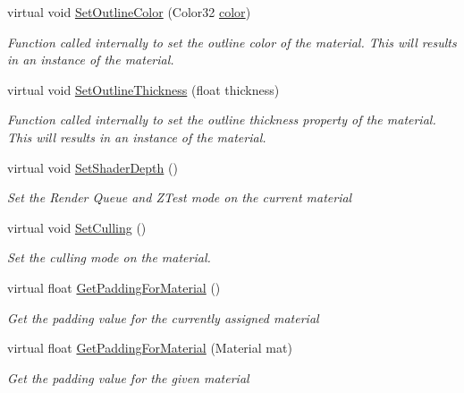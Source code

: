 \begin{DoxyCompactItemize}
virtual void \mbox{\hyperlink{class_t_m_pro_1_1_t_m_p___text_a726c0894801737f281ecf5656e9ee4d0}{Set\+Outline\+Color}} (Color32 \mbox{\hyperlink{class_t_m_pro_1_1_t_m_p___text_af874b3b1f2d1565c68e0c3ad9f79e5c4}{color}})
\begin{DoxyCompactList}\small\item\em Function called internally to set the outline color of the material. This will results in an instance of the material. \end{DoxyCompactList}\item 
virtual void \mbox{\hyperlink{class_t_m_pro_1_1_t_m_p___text_a64858ad286418942ec69bc438eec39d4}{Set\+Outline\+Thickness}} (float thickness)
\begin{DoxyCompactList}\small\item\em Function called internally to set the outline thickness property of the material. This will results in an instance of the material. \end{DoxyCompactList}\item 
virtual void \mbox{\hyperlink{class_t_m_pro_1_1_t_m_p___text_a311f4fd9aa77c8cd143b686f555aa579}{Set\+Shader\+Depth}} ()
\begin{DoxyCompactList}\small\item\em Set the Render Queue and Z\+Test mode on the current material \end{DoxyCompactList}\item 
virtual void \mbox{\hyperlink{class_t_m_pro_1_1_t_m_p___text_afd461774563d324758a3d21f5085edf1}{Set\+Culling}} ()
\begin{DoxyCompactList}\small\item\em Set the culling mode on the material. \end{DoxyCompactList}\item 
virtual float \mbox{\hyperlink{class_t_m_pro_1_1_t_m_p___text_a7182ea72ca6b396af6cae05cee59243d}{Get\+Padding\+For\+Material}} ()
\begin{DoxyCompactList}\small\item\em Get the padding value for the currently assigned material \end{DoxyCompactList}\item 
virtual float \mbox{\hyperlink{class_t_m_pro_1_1_t_m_p___text_a1c51fe580e2440116d1de1280b9d189f}{Get\+Padding\+For\+Material}} (Material mat)
\begin{DoxyCompactList}\small\item\em Get the padding value for the given material \end{DoxyCompactList}\item 

\end{DoxyCompactItemize}
